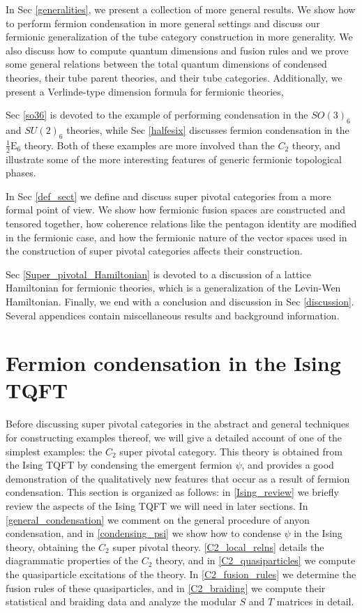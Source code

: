 \documentclass[12pt,a4paper]{article}
\newcommand{\halfesix}{\frac{1}{2}\text{E}_6}
\begin{document}
In Sec \ref{generalities}, we present a collection of more general results. 
We show how to perform fermion condensation in more general settings
and discuss our fermionic generalization 
of the tube category construction in more generality.
We also discuss how to compute quantum dimensions and fusion rules
and we prove some general
relations between the total quantum dimensions of condensed theories, their 
tube parent theories, and their tube categories.
Additionally, we present a Verlinde-type
dimension formula for fermionic theories,


Sec \ref{so36} is devoted to the example of performing condensation in the $SO(3)_6$ 
and $SU(2)_6$ theories, while Sec \ref{halfesix} discusses fermion condensation in the $
\halfesix$ theory. 
Both of these examples are more involved than the $C_2$ theory, 
and illustrate some of the more interesting features of generic fermionic topological phases. 

In Sec \ref{def_sect} we define and discuss super pivotal categories from a more formal point of view. 
We show how fermionic fusion spaces are constructed and tensored together, how 
coherence relations like the pentagon identity are modified in the fermionic case, 
and how the fermionic nature of the vector spaces used in the construction of super 
pivotal categories affects their construction. 

Sec \ref{Super_pivotal_Hamiltonian} is devoted to a discussion of a lattice Hamiltonian for fermionic theories, which is a generalization of the Levin-Wen Hamiltonian. 
Finally, we end with a conclusion and discussion in Sec \ref{discussion}. 
Several appendices contain miscellaneous results and background information. 



\section{Fermion condensation in the Ising TQFT}  \label{C2_condense_sect}

Before discussing super pivotal categories in the abstract and general techniques for constructing examples thereof,
we will give a detailed account of one of the simplest examples:
the $C_2$ super pivotal category.
This theory 
is obtained from the Ising TQFT by condensing the emergent fermion $\psi$, and provides a good demonstration of the qualitatively new features that occur as a result of fermion condensation. 
This section is organized as follows: in \ref{Ising_review} we briefly review the aspects of the Ising TQFT we will need in later sections. 
In \ref{general_condensation} we comment on the general procedure of anyon condensation, and in \ref{condensing_psi} we show how to condense $\psi$ in the Ising theory, obtaining the $C_2$ super pivotal theory. 
\ref{C2_local_relns} details the diagrammatic properties of the $C_2$ theory, and in \ref{C2_quasiparticles} we compute the quasiparticle excitations of the theory. 
In \ref{C2_fusion_rules} we determine the fusion rules of these quasiparticles, and in \ref{C2_braiding} we compute their statistical and braiding data and analyze the modular $S$ and $T$ matrices in detail. 
\end{document}
